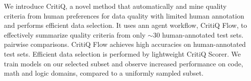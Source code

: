 We introduce CritiQ, a novel method that automatically and mine quality criteria
from human preferences for data quality with limited human annotation and performs
efficient data selection. It uses ann agent workflow, CritiQ Flow, to
effectively summarize quality criteria from only $\sim$30 human-annotated test sets.
pairwise comparisons. CritiQ Flow achieves high accuracies on human-annotated
test sets. Efficient data selection is performed by lightweight CritiQ Scorer.
We train models on our selected subset and observe increased performance on code,
math and logic domains, compared to a uniformly sampled subset.%
